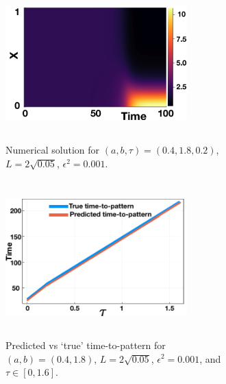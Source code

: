 \begin{figure}[H]
    \centering
    \begin{subfigure}[b]{0.45\textwidth}
        \centering
        \includegraphics[width=7cm,height=6cm]{dispnumsim.png}
        \caption{Numerical solution for $(a,b,\tau)=(0.4,1.8,0.2)$, $L=2\sqrt{0.05}$, $\epsilon^2=0.001$.}
        \label{fig:dispnumsim}
    \end{subfigure}
    \hfill
    \begin{subfigure}[b]{0.45\textwidth}
        \centering
        \includegraphics[width=7cm,height=6cm]{ttp1.png}
        \caption{Predicted vs `true' time-to-pattern for $(a,b)=(0.4,1.8)$, $L=2\sqrt{0.05}$, $\epsilon^2=0.001$, and $\tau\in[0,1.6]$.}
        \label{fig:ttp1}
    \end{subfigure}
    \caption{}
    \label{}
\end{figure}

